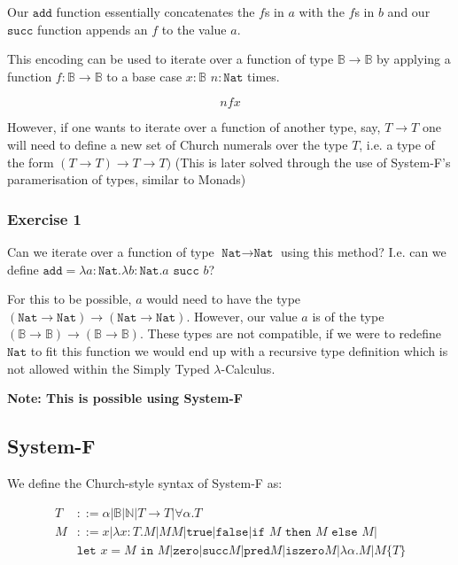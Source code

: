 \documentclass{article}
\newcommand{\B}{\mathbb{B}}
\newcommand{\N}{\mathbb{N}}
\newcommand{\Nat}{\texttt{Nat}}
\newcommand{\rarr}{\rightarrow}
\begin{document}
Our $ \texttt{add}$ function essentially concatenates the $f$s in $a$ with the $f$s in $b$ and our $ \texttt{succ}$ function appends an $f$ to the value $a$.

This encoding can be used to iterate over a function of type $\B \rarr \B$ by applying a function $f : \B \rarr \B$ to a base case $ x : \B$ $n : \Nat$ times.

$$ 
n f x 
$$

However, if one wants to iterate over a function of another type, say, $ T\rarr T$ one will need to define a new set of Church numerals over the type $T$, i.e. a type of the form $(T\rarr T) \rarr T \rarr T)$ (This is later solved through the use of System-F's paramerisation of types, similar to Monads)

\subsubsection{Exercise 1}

Can we iterate over a function of type $\Nat \rarr \Nat$ using this method? I.e. can we define $ \texttt{add} = \lambda a:\Nat. \lambda b:\Nat.a \texttt{ succ } b$?

For this to be possible, $a$ would need to have the type $(\Nat \rarr \Nat) \rarr (\Nat \rarr \Nat)$. However, our value $a$ is of the type $(\B \rarr \B) \rarr (\B \rarr \B)$. These types are not compatible, if we were to redefine $\Nat$ to fit this function we would end up with a recursive type definition which is not allowed within the Simply Typed $\lambda$-Calculus.

\textbf{Note: This is possible using System-F} 

\subsection{System-F}

We define the Church-style syntax of System-F as:

\begin{align*}
    T &::= \alpha | \B | \N | T \rarr T | \forall \alpha. T \\
    M &::= x | \lambda x:T.M | M M | \texttt{true} | \texttt{false} | \texttt{if } M \texttt{ then } M \texttt{ else } M | \\ & \texttt{let }  x = M \texttt{ in } M | \texttt{zero} | \texttt{succ} M | \texttt{pred} M | \texttt{iszero} M | \lambda \alpha .M | M\{T\}
\end{align*}
\end{document}
